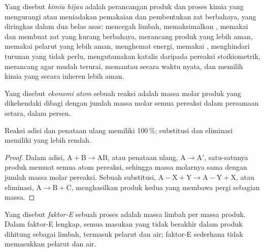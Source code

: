 \begin{definition}\label{def:b3:green-industrial:green-chemistry}
Yang disebut \emph{kimia hijau} adalah perancangan produk
dan proses kimia yang mengurangi atau meniadakan pemakaian dan pembentukan
zat berbahaya, yang diringkas dalam dua belas asas: mencegah limbah, memaksimalkan
, memakai dan membuat zat yang kurang berbahaya, merancang produk yang lebih aman,
memakai pelarut yang lebih aman, menghemat energi, memakai , menghindari turunan
yang tidak perlu, mengutamakan katalis daripada pereaksi stoikiometrik, merancang agar mudah
terurai, memantau secara waktu nyata, dan memilih kimia yang secara inheren lebih aman.
\end{definition}

\begin{definition}\label{def:b3:green-industrial:atom-economy}
Yang disebut \emph{ekonomi atom} sebuah reaksi adalah massa molar
produk yang dikehendaki dibagi dengan jumlah massa molar semua
pereaksi dalam persamaan setara, dalam persen.
\end{definition}

\begin{proposition}\label{prop:b3:green-industrial:ae-classes}
Reaksi adisi dan penataan ulang memiliki  100\,\%; substitusi dan
eliminasi memiliki  yang lebih rendah.
\end{proposition}

\begin{proof}
Dalam adisi, $\mathrm{A} + \mathrm{B} \to \mathrm{AB}$, atau penataan ulang, $\mathrm{A} \to \mathrm{A'}$, satu-satunya produk memuat semua
atom pereaksi, sehingga massa molarnya sama dengan jumlah massa molar pereaksi. Sebuah
substitusi, $\mathrm{A{-}X} + \mathrm{Y} \to \mathrm{A{-}Y} + \mathrm{X}$, atau eliminasi, $\mathrm{A} \to \mathrm{B} + \mathrm{C}$, menghasilkan
produk kedua yang membawa pergi sebagian massa.
\end{proof}

\begin{definition}[Faktor-E]\label{def:b3:green-industrial:e-factor}
Yang disebut \emph{faktor-E} sebuah proses adalah massa limbah per massa
produk. Dalam faktor-E lengkap, semua masukan yang tidak berakhir dalam produk dihitung sebagai
limbah, termasuk pelarut dan air; faktor-E sederhana tidak memasukkan pelarut dan
air.
\end{definition}

